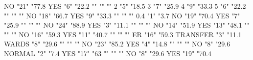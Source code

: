 \documentclass{article}\usepackage[]{graphicx}\usepackage[]{color}
\begin{document}
NO                                  "21"           "77.8%
YES                                 "6"            "22.2%
                                    ""             ""      ""         
2                                   "5"            "18.5%
3                                   "7"            "25.9%
4                                   "9"            "33.3%
5                                   "6"            "22.2%
                                    ""             ""      ""         
NO                                  "18"           "66.7%
YES                                 "9"            "33.3%
                                    ""             ""      ""         
0.4                                 "1"            "3.7%
NO                                  "19"           "70.4%
YES                                 "7"            "25.9%
                                    ""             ""      ""         
NO                                  "24"           "88.9%
YES                                 "3"            "11.1%
                                    ""             ""      ""         
NO                                  "14"           "51.9%
YES                                 "13"           "48.1%
                                    ""             ""      ""         
NO                                  "16"           "59.3%
YES                                 "11"           "40.7%
                                    ""             ""      ""         
ER                                  "16"           "59.3%
TRANSFER                            "3"            "11.1%
WARDS                               "8"            "29.6%
                                    ""             ""      ""         
NO                                  "23"           "85.2%
YES                                 "4"            "14.8%
                                    ""             ""      ""         
NO                                  "8"            "29.6%
NORMAL                              "2"            "7.4%
YES                                 "17"           "63%
                                    ""             ""      ""         
NO                                  "8"            "29.6%
YES                                 "19"           "70.4%
\end{document}
